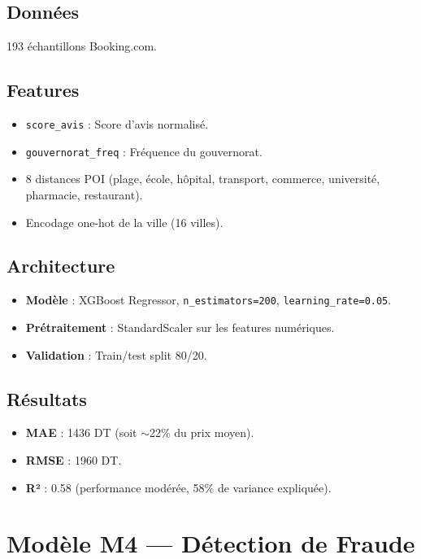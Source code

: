 \documentclass[12pt,a4paper]{report}
\begin{document}
\subsection{Données}
193 échantillons Booking.com.

\subsection{Features}
\begin{itemize}
    \item \texttt{score\_avis} : Score d'avis normalisé.
    \item \texttt{gouvernorat\_freq} : Fréquence du gouvernorat.
    \item 8 distances POI (plage, école, hôpital, transport, commerce, université, pharmacie, restaurant).
    \item Encodage one-hot de la ville (16 villes).
\end{itemize}

\subsection{Architecture}
\begin{itemize}
    \item \textbf{Modèle} : XGBoost Regressor, \texttt{n\_estimators=200}, \texttt{learning\_rate=0.05}.
    \item \textbf{Prétraitement} : StandardScaler sur les features numériques.
    \item \textbf{Validation} : Train/test split 80/20.
\end{itemize}

\subsection{Résultats}
\begin{itemize}
    \item \textbf{MAE} : 1436 DT (soit $\sim$22\% du prix moyen).
    \item \textbf{RMSE} : 1960 DT.
    \item \textbf{R²} : 0.58 (performance modérée, 58\% de variance expliquée).
\end{itemize}

\section{Modèle M4 — Détection de Fraude}
\end{document}
